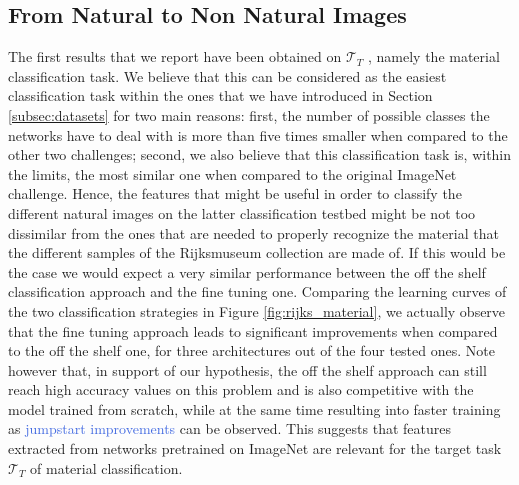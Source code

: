 \subsection{From Natural to Non Natural Images}
\label{subsec: natural_to_art}

The first results that we report have been obtained on $\mathcal{T}_T$ , namely the material classification task. We believe that this can be considered as the easiest classification task within the ones that we have introduced in Section \ref{subsec:datasets} for two main reasons: first, the number of possible classes the networks have to deal with is more than five times smaller when compared to the other two challenges; second, we also believe that this classification task is, within the limits, the most similar one when compared to the original ImageNet challenge. Hence, the features that might be useful in order to classify the different natural images on the latter classification testbed might be not too dissimilar from the ones that are needed to properly recognize the material that the different samples of the Rijksmuseum collection are made of. If this would be the case we would expect a very similar performance between the off the shelf classification approach and the fine tuning one. Comparing the learning curves of the two classification strategies in Figure \ref{fig:rijks_material}, we actually observe that the fine tuning approach leads to significant improvements when compared to the off the shelf one, for three architectures out of the four tested ones. Note however that, in support of our hypothesis, the off the shelf approach can still reach high accuracy values on this problem and is also competitive with the model trained from scratch, while at the same time resulting into faster training as \textcolor{RoyalBlue}{jumpstart improvements} can be observed. This suggests that features extracted from networks pretrained on ImageNet are relevant for the target task $\mathcal{T}_T$ of material classification.



